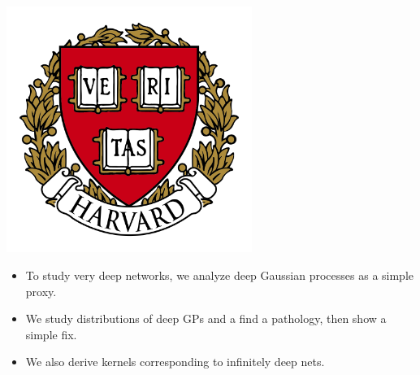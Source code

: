 \documentclass[portrait,a0b,final,a4resizeable]{include/a0poster}
\begin{document}
\begin{poster}
\begin{center}
\begin{pcolumn}{0.99}
{%
%
\begin{minipage}[c]{\logowidth}
  \begin{flushright}
    \includegraphics[width=8cm,trim=2em 0em 2em 2em, clip]{badges/harvard}
  \end{flushright}
\end{minipage}
%
}
\end{pcolumn}
\end{center}

\vspace*{2.5cm}

\large




\begin{multicols}{2}





\begin{itemize}
	\item To study very deep networks, we analyze deep Gaussian processes as a simple proxy.
	\item We study distributions of deep GPs and a find a pathology, then show a simple fix.
	\item We also derive kernels corresponding to infinitely deep nets.
\end{itemize}

\vspace{0.5in}


\end{multicols}
\end{poster}
\end{document}
